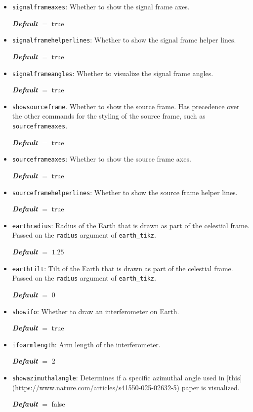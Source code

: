 \documentclass[
    DIV=11,
    BCOR=0mm,
    paper=a4,
    fontsize=11pt,
    twoside=false,
    titlepage=true
]{scrartcl}
\newcommand{\code}[1]{\textcolor{codecolor}{\texttt{#1}}}
\newcommand{\defaultval}[1]{%
    {\bfseries\slshape%
    Default} $=$ #1%
}
\begin{document}
\begin{itemize}
    \item \code{signalframeaxes}: Whether to show the signal frame axes.

    \defaultval{true}


    \item \code{signalframehelperlines}: Whether to show the signal frame helper lines.

    \defaultval{true}


    \item \code{signalframeangles}: Whether to visualize the signal frame angles.

    \defaultval{true}


    \item \code{showsourceframe}. Whether to show the source frame. Has precedence over the other commands for the styling of the source frame, such as \code{sourceframeaxes}.

    \defaultval{true}


    \item \code{sourceframeaxes}: Whether to show the source frame axes.

    \defaultval{true}


    \item \code{sourceframehelperlines}: Whether to show the source frame helper lines.

    \defaultval{true}


    \item \code{earthradius}: Radius of the Earth that is drawn as part of the celestial frame. Passed on the \code{radius} argument of \code{earth\_tikz}.

    \defaultval{$1.25$}


    \item \code{earthtilt}: Tilt of the Earth that is drawn as part of the celestial frame. Passed on the \code{radius} argument of \code{earth\_tikz}.

    \defaultval{$0$}


    \item \code{showifo}: Whether to draw an interferometer on Earth.

    \defaultval{true}


    \item \code{ifoarmlength}: Arm length of the interferometer.

    \defaultval{$2$}


    \item \code{showazimuthalangle}: Determines if a specific azimuthal angle used in [this](https://www.nature.com/articles/s41550-025-02632-5) paper is visualized.

    \defaultval{false}
\end{itemize}
\end{document}
